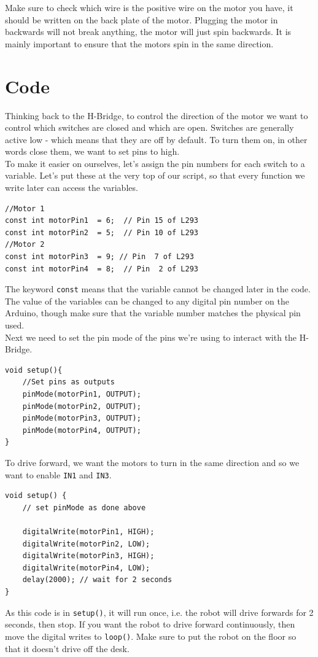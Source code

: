 \documentclass[a4paper,12pt]{article}
\begin{document}
Make sure to check which wire is the positive wire on the motor you have, it should be written on the back plate of the motor. Plugging the motor in backwards will not break anything, the motor will just spin backwards. 
It is mainly important to ensure that the motors spin in the same direction. 


\newpage
\section{Code}




\pagebreak

Thinking back to the H-Bridge, to control the direction of the motor we want to control which switches are closed and which are open. Switches are generally active low - which means that they are off by default. To turn them on, in other words close them, we want to set pins to high. \\

To make it easier on ourselves, let's assign the pin numbers for each switch to a variable. Let's put these at the very top of our script, so that every function we write later can access the variables. 

\begin{lstlisting}
//Motor 1
const int motorPin1  = 6;  // Pin 15 of L293
const int motorPin2  = 5;  // Pin 10 of L293
//Motor 2
const int motorPin3  = 9; // Pin  7 of L293
const int motorPin4  = 8;  // Pin  2 of L293
\end{lstlisting}

The keyword \lstinline[]!const! means that the variable cannot be changed later in the code. 
The value of the variables can be changed to any digital pin number on the Arduino, though make sure that the variable number matches the physical pin used. \\


Next we need to set the pin mode of the pins we're using to interact with the H-Bridge.

\begin{lstlisting}
void setup(){
    //Set pins as outputs
    pinMode(motorPin1, OUTPUT);
    pinMode(motorPin2, OUTPUT);
    pinMode(motorPin3, OUTPUT);
    pinMode(motorPin4, OUTPUT);
}
\end{lstlisting}


To drive forward, we want the motors to turn in the same direction and so we want to enable \lstinline[]!IN1! and \lstinline[]!IN3!. 

\begin{lstlisting}
void setup() {
    // set pinMode as done above

    digitalWrite(motorPin1, HIGH);
    digitalWrite(motorPin2, LOW);
    digitalWrite(motorPin3, HIGH);
    digitalWrite(motorPin4, LOW);
    delay(2000); // wait for 2 seconds
}
\end{lstlisting}
As this code is in \lstinline[]!setup()!, it will run once, i.e. the robot will drive forwards for 2 seconds, then stop. If you want the robot to drive forward continuously, then move the digital writes to \lstinline[]!loop()!. Make sure to put the robot on the floor so that it doesn't drive off the desk.
\end{document}
